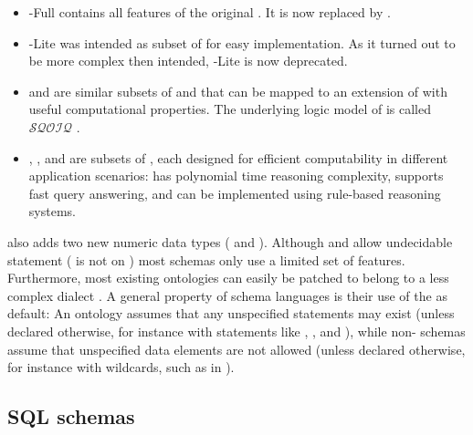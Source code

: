 \begin{itemize}
\item {}-Full contains all features of the original .
  It is now replaced by .
\item {}-Lite was intended as subset of  for easy 
  implementation. As it turned out to be more complex then intended, 
  -Lite is now deprecated.
\item {} and  are similar subsets of  and
   that can be mapped to an extension of  with
  useful computational properties. The underlying logic model of  is 
  called $\mathcal{SQOIQ}$ \cite{Horrocks2006}.
\item 
  , , and
   are subsets of , each
  designed for efficient computability in different application
  scenarios:  has polynomial time reasoning complexity,
   supports fast query answering, and  can
  be implemented using rule-based reasoning systems.
\end{itemize}

 also adds two new numeric data types ( and
).  Although  and  allow undecidable
statement ( is not on ) most schemas only use a
limited set of features. Furthermore, most existing ontologies can easily be
patched to belong to a less complex dialect \cite{Wang2006,MartinezGil2010}. A
general property of  schema languages is their use of the  as default:
An  ontology
assumes that any unspecified statements may exist (unless declared otherwise,
for instance with statements like , , and 
), while non- schemas assume that unspecified
data elements are not allowed (unless declared otherwise, for instance with
wildcards, such as  in ).

\subsection{SQL schemas}
\label{sec:sqlschemas}

